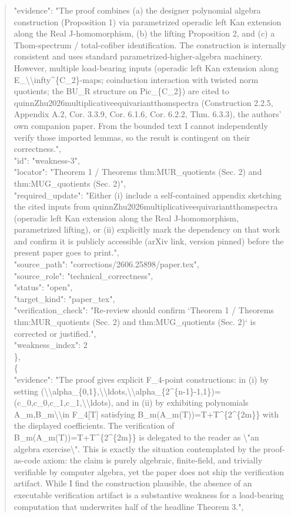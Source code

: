 \documentclass[11pt]{article}
\begin{document}
\begin{quote}
      "evidence": "The proof combines (a) the designer polynomial algebra construction (Proposition 1) via parametrized operadic left Kan extension along the Real J-homomorphism, (b) the lifting Proposition 2, and (c) a Thom-spectrum / total-cofiber identification. The construction is internally consistent and uses standard parametrized-higher-algebra machinery. However, multiple load-bearing inputs (operadic left Kan extension along E\_\textbackslash{}\textbackslash{}infty\^{}\{C\_2\}-maps; coinduction interaction with twisted norm quotients; the BU\_R structure on Pic\_\{C\_2\}) are cited to quinnZhu2026multiplicativeequivariantthomspectra (Construction 2.2.5, Appendix A.2, Cor. 3.3.9, Cor. 6.1.6, Cor. 6.2.2, Thm. 6.3.3), the authors' own companion paper. From the bounded text I cannot independently verify those imported lemmas, so the result is contingent on their correctness.",\\
      "id": "weakness-3",\\
      "locator": "Theorem 1 / Theorems thm:MUR\_quotients (Sec. 2) and thm:MUG\_quotients (Sec. 2)",\\
      "required\_update": "Either (i) include a self-contained appendix sketching the cited inputs from quinnZhu2026multiplicativeequivariantthomspectra (operadic left Kan extension along the Real J-homomorphism, parametrized lifting), or (ii) explicitly mark the dependency on that work and confirm it is publicly accessible (arXiv link, version pinned) before the present paper goes to print.",\\
      "source\_path": "corrections/2606.25898/paper.tex",\\
      "source\_role": "technical\_correctness",\\
      "status": "open",\\
      "target\_kind": "paper\_tex",\\
      "verification\_check": "Re-review should confirm `Theorem 1 / Theorems thm:MUR\_quotients (Sec. 2) and thm:MUG\_quotients (Sec. 2)` is corrected or justified.",\\
      "weakness\_index": 2\\
    \},\\
    \{\\
      "evidence": "The proof gives explicit F\_4-point constructions: in (i) by setting (\textbackslash{}\textbackslash{}alpha\_\{0,1\},\textbackslash{}\textbackslash{}ldots,\textbackslash{}\textbackslash{}alpha\_\{2\^{}\{n-1\}-1,1\})=(c\_0,c\_0,c\_1,c\_1,\textbackslash{}\textbackslash{}ldots), and in (ii) by exhibiting polynomials A\_m,B\_m\textbackslash{}\textbackslash{}in F\_4[T] satisfying B\_m(A\_m(T))=T+T\^{}\{2\^{}\{2m\}\} with the displayed coefficients. The verification of B\_m(A\_m(T))=T+T\^{}\{2\^{}\{2m\}\} is delegated to the reader as \textbackslash{}"an algebra exercise\textbackslash{}". This is exactly the situation contemplated by the proof-as-code axiom: the claim is purely algebraic, finite-field, and trivially verifiable by computer algebra, yet the paper does not ship the verification artifact. While I find the construction plausible, the absence of an executable verification artifact is a substantive weakness for a load-bearing computation that underwrites half of the headline Theorem 3.",\\

\end{quote}
\end{document}

